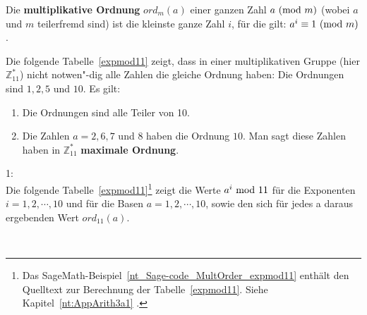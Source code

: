 \begin{refsegment}
\begin{definition}\label{def-zth-ordn}
Die \textbf{multiplikative Ordnung} 
$ord_m(a)$ einer ganzen Zahl $a {\rm ~(mod~} m)$ (wobei $a$ und $m$
teilerfremd sind) ist die kleinste ganze Zahl $i$, für die gilt:
 $a^i \equiv 1 {\rm ~(mod~} m)$.
\end{definition}

Die folgende Tabelle~\ref{expmod11} zeigt, dass in einer multiplikativen Gruppe
(hier $\mathbb{Z}_{11}^*$) nicht notwen"-dig alle Zahlen die gleiche Ordnung
haben: Die Ordnungen sind $1, 2, 5$ und $10$. Es gilt:
\begin{enumerate}
  \item Die Ordnungen sind alle Teiler von 10.
  \item Die Zahlen $a = 2, 6, 7$ und $8$ haben die Ordnung $10$.
        Man sagt diese Zahlen haben in $\mathbb{Z}_{11}^*$
        \textbf{maximale Ordnung}.
\end{enumerate}

\begin{example}{ 1:}\\
Die folgende Tabelle~\ref{expmod11}\footnote{%
  Das SageMath-Beispiel~\ref{nt_Sage-code_MultOrder_expmod11} enthält den
  Quelltext zur Berechnung der Tabelle~\ref{expmod11}.
  Siehe Kapitel~\ref{nt:AppArith3a1} \glqq {}\grqq.}
zeigt die Werte $a^i{\rm ~mod~}11$ für die Exponenten $i = 1, 2, \cdots, 10$
und für die Basen $a = 1, 2, \cdots, 10$, sowie den sich für jedes a daraus
ergebenden Wert $ord_{11}(a)$.
\end{example}\\


\end{refsegment}
